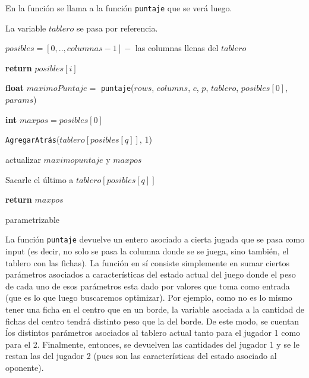 \documentclass[A4paper,oneside,fleqn,11pt]{article}
\theoremstyle{definition}
\begin{document}
En la función se llama a la función \texttt{puntaje} que se verá luego.

La variable $tablero$ se pasa por referencia.
\begin{algorithm}


    
    	$posibles = [0,..,columnas-1] -$ las columnas llenas del $tablero$

    	\For{$i \leftarrow [0,..,\lvert posibles \rvert$)}
    		{

    			{
    			\textbf{return} $posibles[i]$
    			}
    		}

    	\textbf{float} $maximoPuntaje =$ \texttt{puntaje}($rows$, $columns$, $c$, $p$, $tablero$, $posibles[0]$, $params$)

    	\textbf{int} $maxpos = posibles[0]$
    	
    	\For{$q \leftarrow [1,..,\lvert posibles \rvert$)}
    		{

			\texttt{AgregarAtrás}($tablero[posibles[q]]$, 1)

				{
				actualizar $maximopuntaje$ y $maxpos$
				}

			Sacarle el último a $tablero[posibles[q]]$		
			}

		\textbf{return} $maxpos$
    
    
    \caption{parametrizable}

\end{algorithm}


La función \texttt{puntaje} devuelve un entero asociado a cierta jugada que se pasa como input (es decir, no solo se pasa la columna donde se se juega, sino también, el tablero con las fichas). La función en sí consiste simplemente en sumar ciertos parámetros asociados a características del estado actual del juego donde el peso de cada uno de esos parámetros esta dado por valores que toma como entrada (que es lo que luego buscaremos optimizar). Por ejemplo, como no es lo mismo tener una ficha en el centro que en un borde, la variable asociada a la cantidad de fichas del centro tendrá distinto peso que la del borde. De este modo, se cuentan ĺos distintos parámetros asociados al tablero actual tanto para el jugador 1 como para el 2. Finalmente, entonces, se devuelven las cantidades del jugador 1 y se le restan las del jugador 2 (pues son las características del estado asociado al oponente).
\end{document}
